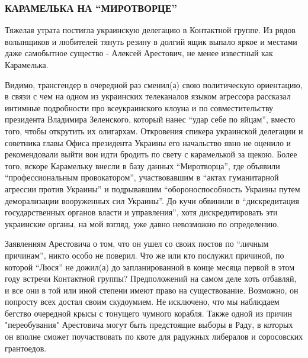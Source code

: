 \subsubsection{КАРАМЕЛЬКА НА \enquote{МИРОТВОРЦЕ}}

Тяжелая утрата постигла украинскую делегацию в Контактной группе. Из рядов
волынщиков и любителей тянуть резину в долгий ящик выпало яркое и местами даже
самобытное существо - Алексей Арестович, не менее известный как Карамелька.

Видимо, трансгендер в очередной раз сменил(а) свою политическую ориентацию, в
связи с чем на одном из украинских телеканалов языком агрессора рассказал
интимные подробности про всеукраинского клоуна и по совместительству президента
Владимира Зеленского, который нанес \enquote{удар себе по яйцам}, вместо того, чтобы
открутить их олигархам. Откровения спикера украинской делегации и советника
главы Офиса президента Украины его начальство явно не оценило и рекомендовали
выйти вон идти бродить по свету с карамелькой за щекою. Более того, вскоре
Карамельку внесли в базу данных \enquote{Миротворца}, где объявили \enquote{профессиональным
провокатором}, участвовавшим в \enquote{актах гуманитарной агрессии против Украины} и
подрывавшим \enquote{обороноспособность Украины путем деморализации вооруженных сил
Украины}. До кучи обвинили в \enquote{дискредитация государственных органов власти и
управления}, хотя дискредитировать эти украинские органы, на мой взгляд, уже
давно невозможно по определению.

Заявлениям Арестовича о том, что он ушел со своих постов по \enquote{личным причинам},
никто особо не поверил. Что же или кто послужил причиной, по которой \enquote{Люся} не
дожил(а) до запланированной в конце месяца первой в этом году встречи
Контактной группы? Предположений на самом деле хоть отбавляй, и все они в той
или иной степени имеют право на существование. Возможно, он попросту всех
достал своим скудоумием. Не исключено, что мы наблюдаем бегство очередной крысы
с тонущего чумного корабля. Также одной из причин "переобувания" Арестовича
могут быть предстоящие выборы в Раду, в которых он вполне сможет поучаствовать
по квоте для радужных либералов и соросовских грантоедов.

